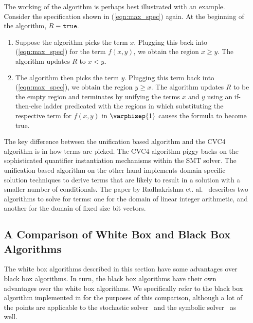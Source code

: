 The working of the algorithm is perhaps best illustrated with an
example. Consider the specification shown in (\ref{eqn:max_spec})
again. At the beginning of the algorithm, $R \equiv \mathtt{true}$.
\begin{enumerate}
\item
Suppose the algorithm picks the term $x$. Plugging this back into
(\ref{eqn:max_spec}) for the term $f(x, y)$, we obtain the region $x
\ge y$. The algorithm updates $R$ to $x < y$.
\item
The algorithm then picks the term $y$. Plugging this term back into
(\ref{eqn:max_spec}), we obtain the region $y \ge x$. The algorithm
updates $R$ to be the empty region and terminates by unifying the
terms $x$ and $y$ using an if-then-else ladder predicated with the
regions in which substituting the respective term for $f(x, y)$ in
$\varphisep{1}$ causes the formula to become true.
\end{enumerate}

The key difference between the unification based algorithm and the CVC4
algorithm is in how terms are picked. The CVC4 algorithm piggy-backs on
the sophisticated quantifier instantiation mechanisms within the SMT
solver. The unification based algorithm on the other hand implements
domain-specific solution techniques to derive terms that are likely to
result in a solution with a smaller number of conditionals. The paper
by Radhakrishna et. al.~\cite{radhakrishna-15} describes two algorithms to
solve for terms: one for the domain of linear integer arithmetic, and
another for the domain of fixed size bit vectors.

\subsection{A Comparison of White Box and Black Box Algorithms}
\label{subsection:white_black_comparison}
The white box algorithms described in this section have some
advantages over black box algorithms. In turn, the black box
algorithms have their own advantages over the white box algorithms. We
specifically refer to the black box algorithm implemented in \esolver
for the purposes of this comparison, although a lot of the points are
applicable to the stochastic solver~\cite{schkufza-13} and the
symbolic solver~\cite{jha-10, gulwani-pldi-11} as well.

